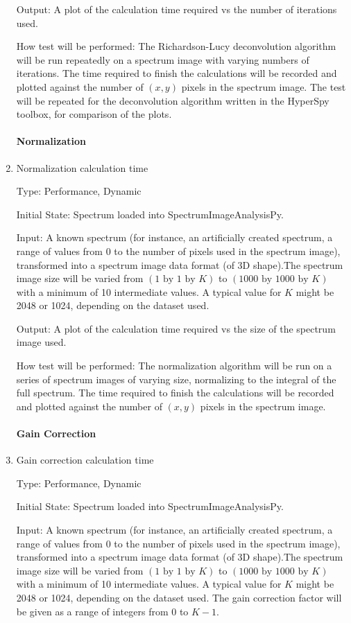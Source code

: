 \documentclass[12pt, titlepage]{article}
\newcommand{\progname}{SpectrumImageAnalysisPy}
\begin{document}
\begin{enumerate}
Output: A plot of the calculation time required vs the number of iterations
used.

How test will be performed: The Richardson-Lucy deconvolution algorithm will be
run repeatedly on a spectrum image with varying numbers of iterations. The time
required to finish the calculations will be recorded and plotted against the
number of $(x, y)$ pixels in the spectrum image.  The test will be repeated for
the deconvolution algorithm written in the HyperSpy toolbox, for comparison of
the plots.\\

\paragraph{Normalization}
\item{Normalization calculation time}

Type: Performance, Dynamic

Initial State: Spectrum loaded into \progname{}.

Input: A known spectrum (for instance, an artificially created spectrum, a range
of values from 0 to the number of pixels used in the spectrum image),
transformed into a spectrum image data format (of 3D shape).The spectrum image
size will be varied from $(1\text{ by }1\text{ by }K)$ to $(1000 \text{ by }
1000 \text{ by }K)$ with a minimum of 10 intermediate values. A typical value
for $K$ might be 2048 or 1024, depending on the dataset used.

Output: A plot of the calculation time required vs the size of the spectrum
image used.

How test will be performed: The normalization algorithm will be run on a series
of spectrum images of varying size, normalizing to the integral of the full
spectrum. The time required to finish the calculations will be recorded and
plotted against the number of $(x, y)$ pixels in the spectrum image.\\

\paragraph{Gain Correction}
\item{Gain correction calculation time}

Type: Performance, Dynamic

Initial State: Spectrum loaded into \progname{}.

Input: A known spectrum (for instance, an artificially created spectrum, a range
of values from 0 to the number of pixels used in the spectrum image),
transformed into a spectrum image data format (of 3D shape).The spectrum image
size will be varied from $(1\text{ by }1\text{ by }K)$ to $(1000 \text{ by }
1000 \text{ by }K)$ with a minimum of 10 intermediate values. A typical value
for $K$ might be 2048 or 1024, depending on the dataset used. The gain
correction factor will be given as a range of integers from 0 to $K-1$.


\end{enumerate}
\end{document}
